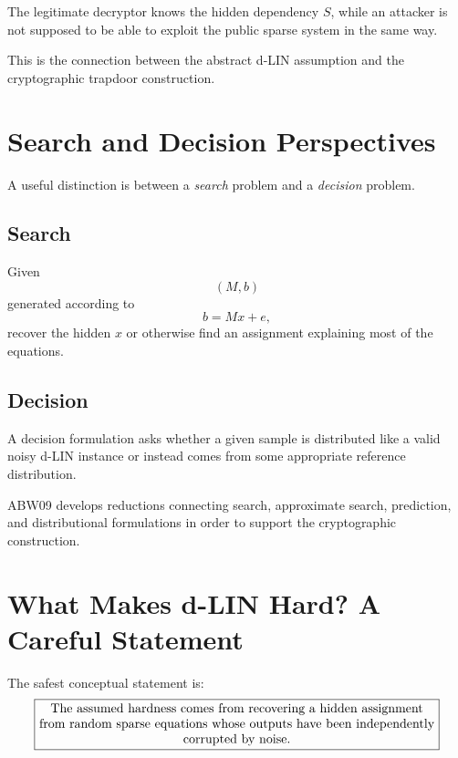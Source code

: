 \documentclass[11pt,a4paper]{article}
\begin{document}
The legitimate decryptor knows the hidden dependency $S$, while an
attacker is not supposed to be able to exploit the public sparse
system in the same way.

This is the connection between the abstract d-LIN assumption and the
cryptographic trapdoor construction.

\section{Search and Decision Perspectives}

A useful distinction is between a \emph{search} problem and a
\emph{decision} problem.
\subsection{Search} Given \begin{equation}
    (M,b)
\end{equation}
generated according to \begin{equation}
    b=Mx+e,
\end{equation} recover the hidden $x$ or otherwise find an assignment explaining
most of the equations.

\subsection{Decision}

A decision formulation asks whether a given sample is distributed
like a valid noisy d-LIN instance or instead comes from some
appropriate reference distribution.

ABW09 develops reductions connecting search, approximate search,
prediction, and distributional formulations in order to support the
cryptographic construction.


\section{What Makes d-LIN Hard? A Careful Statement}

The safest conceptual statement is:
\begin{equation}
\boxed{
\parbox{0.9\textwidth}{
\centering %
The assumed hardness comes from recovering a hidden assignment
from random sparse equations whose outputs have been independently
corrupted by noise.
}}
\end{equation}
\end{document}
